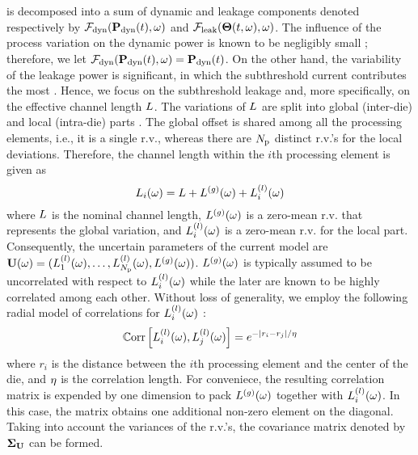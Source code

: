  is decomposed into a sum of dynamic and leakage components denoted respectively by $\mathcal{F}_{\text{dyn}}(\mathbf{P}_{\text{dyn}}(t), \omega)$ and $\mathcal{F}_{\text{leak}}({\boldsymbol\Theta}(t, \omega), \omega)$. The influence of the process variation on the dynamic power is known to be negligibly small \cite{juan2011, juan2012, srivastava2010}; therefore, we let $\mathcal{F}_{\text{dyn}}(\mathbf{P}_{\text{dyn}}(t), \omega) = \mathbf{P}_{\text{dyn}}(t)$. On the other hand, the variability of the leakage power is significant, in which the subthreshold current contributes the most \cite{juan2011, juan2012}. Hence, we focus on the subthreshold leakage and, more specifically, on the effective channel length $L$. The variations of $L$ are split into global (inter-die) and local (intra-die) parts \cite{juan2011, juan2012, shen2009, srivastava2010}. The global offset is shared among all the processing elements, i.e., it is a single r.v., whereas there are ${N_\text{p}}$ distinct r.v.'s for the local deviations. Therefore, the channel length within the $i$th processing element is given as
\[
  L_i(\omega) = L + {L^{(g)}}(\omega) + L^{(l)}_i(\omega)
\]
where $L$ is the nominal channel length, ${L^{(g)}}(\omega)$ is a zero-mean r.v. that represents the global variation, and $L^{(l)}_i(\omega)$ is a zero-mean r.v. for the local part. Consequently, the uncertain parameters of the current model are $\mathbf{U}(\omega) = (L^{(l)}_1(\omega), \dotsc, L^{(l)}_{N_\text{p}}(\omega), {L^{(g)}}(\omega) )$. ${L^{(g)}}(\omega)$ is typically assumed to be uncorrelated with respect to $L^{(l)}_i(\omega)$ while the later are known to be highly correlated among each other. Without loss of generality, we employ the following radial model of correlations for $L^{(l)}_i(\omega)$ \cite{ghanem1991, cheng2011}:
\begin{equation} \elabel{correlation-matrix}
  \oCorr{\lLeff_i(\o), \lLeff_j(\o)} = e^{-|r_i - r_j|/\corrLength}
\end{equation}
where $r_i$ is the distance between the $i$th processing element and the center of the die, and $\eta$ is the correlation length. For conveniece, the resulting correlation matrix is expended by one dimension to pack ${L^{(g)}}(\omega)$ together with $L^{(l)}_i(\omega)$. In this case, the matrix obtains one additional non-zero element on the diagonal. Taking into account the variances of the r.v.'s, the covariance matrix denoted by $\mCov_\vU$ can be formed.

